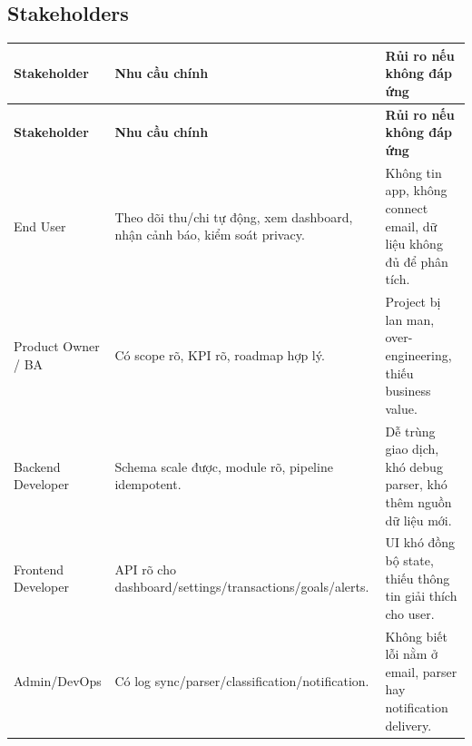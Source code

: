 \documentclass[11pt,a4paper]{article}
\renewcommand{\thead}[1]{\textbf{\color{PrimaryDark}#1}}
\newenvironment{tableblock}{\Needspace{8\baselineskip}\vspace{0.25em}}{\vspace{0.75em}}
\begin{document}
\subsection{Stakeholders}
\begin{tableblock}
\scriptsize
\begin{longtable}{L{3.3cm}L{6.0cm}L{6.0cm}}
\thead{Stakeholder} & \thead{Nhu cầu chính} & \thead{Rủi ro nếu không đáp ứng} \\
\endfirsthead
{}\thead{Stakeholder} & \thead{Nhu cầu chính} & \thead{Rủi ro nếu không đáp ứng} \\
\endhead
End User & Theo dõi thu/chi tự động, xem dashboard, nhận cảnh báo, kiểm soát privacy. & Không tin app, không connect email, dữ liệu không đủ để phân tích. \\
Product Owner / BA & Có scope rõ, KPI rõ, roadmap hợp lý. & Project bị lan man, over-engineering, thiếu business value. \\
Backend Developer & Schema scale được, module rõ, pipeline idempotent. & Dễ trùng giao dịch, khó debug parser, khó thêm nguồn dữ liệu mới. \\
Frontend Developer & API rõ cho dashboard/settings/transactions/goals/alerts. & UI khó đồng bộ state, thiếu thông tin giải thích cho user. \\
Admin/DevOps & Có log sync/parser/classification/notification. & Không biết lỗi nằm ở email, parser hay notification delivery. \\
\end{longtable}
\end{tableblock}
\end{document}
